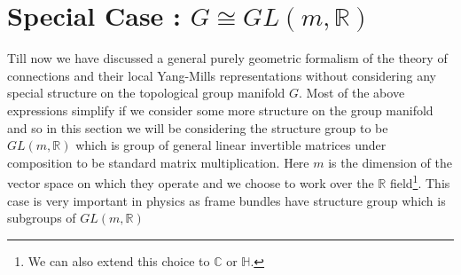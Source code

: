 \documentclass[12pt]{article}
\begin{document}
\section{Special Case : $G \cong GL(m, \mathbb{R})$}
Till now we have discussed a general purely geometric formalism of the theory of connections and their local Yang-Mills representations without considering any special structure on the topological group manifold $G$. Most of the above expressions simplify if we consider some more structure on the group manifold and so in this section we will be considering the structure group to be $GL(m, \mathbb{R})$ which is group of general linear invertible matrices under composition to be standard matrix multiplication. Here $m$ is the dimension of the vector space on which they operate and we choose to work over the $\mathbb{R}$ field\footnote{We can also extend this choice to $\mathbb{C}$ or $\mathbb{H}$.}. This case is very important in physics as frame bundles have structure group which is subgroups of $GL(m, \mathbb{R})$
\end{document}
